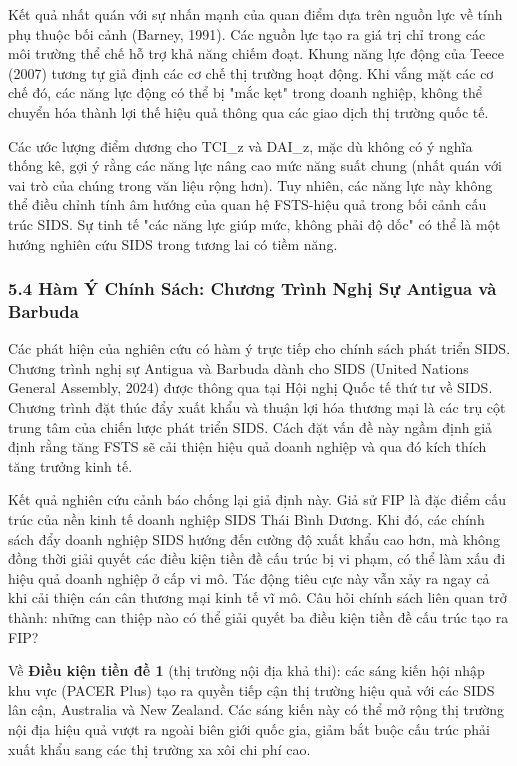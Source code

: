 \documentclass[12pt,a4paper]{article}
\begin{document}
Kết quả nhất quán với sự nhấn mạnh của quan điểm dựa trên nguồn lực về
tính phụ thuộc bối cảnh (Barney, 1991). Các nguồn lực tạo ra giá trị chỉ
trong các môi trường thể chế hỗ trợ khả năng chiếm đoạt. Khung năng lực
động của Teece (2007) tương tự giả định các cơ chế thị trường hoạt động.
Khi vắng mặt các cơ chế đó, các năng lực động có thể bị "mắc kẹt" trong
doanh nghiệp, không thể chuyển hóa thành lợi thế hiệu quả thông qua các
giao dịch thị trường quốc tế.

Các ước lượng điểm dương cho TCI\_z và DAI\_z, mặc dù không có ý nghĩa
thống kê, gợi ý rằng các năng lực nâng cao mức năng suất chung (nhất
quán với vai trò của chúng trong văn liệu rộng hơn). Tuy nhiên, các năng
lực này không thể điều chỉnh tính âm hướng của quan hệ FSTS-hiệu quả
trong bối cảnh cấu trúc SIDS. Sự tinh tế "các năng lực giúp mức, không
phải độ dốc" có thể là một hướng nghiên cứu SIDS trong tương lai có tiềm
năng.

\hypertarget{54-huxe0m-uxfd-chuxednh-suxe1ch-chux1b0ux1a1ng-truxecnh-nghux1ecb-sux1ef1-antigua-vuxe0-barbuda}{%
\subsubsection{5.4 Hàm Ý Chính Sách: Chương Trình Nghị Sự Antigua và
Barbuda}\label{54-huxe0m-uxfd-chuxednh-suxe1ch-chux1b0ux1a1ng-truxecnh-nghux1ecb-sux1ef1-antigua-vuxe0-barbuda}}

Các phát hiện của nghiên cứu có hàm ý trực tiếp cho chính sách phát
triển SIDS. Chương trình nghị sự Antigua và Barbuda dành cho SIDS
(United Nations General Assembly, 2024) được thông qua tại Hội nghị Quốc
tế thứ tư về SIDS. Chương trình đặt thúc đẩy xuất khẩu và thuận lợi hóa
thương mại là các trụ cột trung tâm của chiến lược phát triển SIDS. Cách
đặt vấn đề này ngầm định giả định rằng tăng FSTS sẽ cải thiện hiệu quả
doanh nghiệp và qua đó kích thích tăng trưởng kinh tế.

Kết quả nghiên cứu cảnh báo chống lại giả định này. Giả sử FIP là đặc
điểm cấu trúc của nền kinh tế doanh nghiệp SIDS Thái Bình Dương. Khi đó,
các chính sách đẩy doanh nghiệp SIDS hướng đến cường độ xuất khẩu cao
hơn, mà không đồng thời giải quyết các điều kiện tiền đề cấu trúc bị vi
phạm, có thể làm xấu đi hiệu quả doanh nghiệp ở cấp vi mô. Tác động tiêu
cực này vẫn xảy ra ngay cả khi cải thiện cán cân thương mại kinh tế vĩ
mô. Câu hỏi chính sách liên quan trở thành: những can thiệp nào có thể
giải quyết ba điều kiện tiền đề cấu trúc tạo ra FIP?

Về \textbf{Điều kiện tiền đề 1} (thị trường nội địa khả thi): các sáng
kiến hội nhập khu vực (PACER Plus) tạo ra quyền tiếp cận thị trường hiệu
quả với các SIDS lân cận, Australia và New Zealand. Các sáng kiến này có
thể mở rộng thị trường nội địa hiệu quả vượt ra ngoài biên giới quốc
gia, giảm bắt buộc cấu trúc phải xuất khẩu sang các thị trường xa xôi
chi phí cao.
\end{document}

